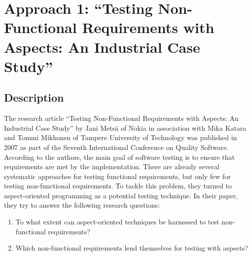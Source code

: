 \newpage
\section{Approach 1: \enquote{Testing Non-Functional Requirements with Aspects: An Industrial Case Study} } \label{given}

\subsection{Description}
The research article \enquote{Testing Non-Functional Requirements with Aspects: An Industrial Case Study} by Jani Metsä of Nokia in association with Mika Katara and Tommi Mikkonen \cite{Metsa} of Tampere University of Technology was published in 2007 as part of the Seventh International Conference on Quality Software. According to the authors, the main goal of software testing is to ensure that requirements are met by the implementation. There are already several systematic approaches for testing functional requirements, but only few for testing non-functional requirements. To tackle this problem, they turned to aspect-oriented programming as a potential testing technique. In their paper, they try to answer the following research questions:

\begin{enumerate}
\item To what extent can aspect-oriented techniques be harnessed to test non-functional requirements?
\item Which non-functional requirements lend themselves for testing with aspects?
\end{enumerate}

